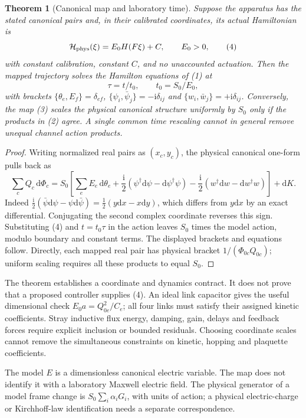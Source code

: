 \documentclass[10pt,a4paper]{article}
\newtheorem{theorem}{Theorem}
\newcommand{\dd}{\mathrm d}
\newcommand{\ii}{\mathrm i}
\begin{document}
\begin{theorem}[Canonical map and laboratory time]\label{th:map}
Suppose the apparatus has the stated canonical pairs and, in their calibrated coordinates, its actual Hamiltonian is
\[
\mathcal H_{\rm phys}(\xi)=E_0 H(F\xi)+C,\qquad E_0>0,
\tag{4}
\]
with constant calibration, constant $C$, and no unaccounted actuation. Then the mapped trajectory solves the Hamilton equations of (1) at
\[
\tau=t/t_0,\qquad t_0=S_0/E_0,
\tag{5}
\]
with brackets $\{\theta_e,E_f\}=\delta_{ef}$, $\{\psi_i,\bar\psi_j\}=-\ii\delta_{ij}$ and $\{w_i,\bar w_j\}=+\ii\delta_{ij}$. Conversely, the map (3) scales the physical canonical structure uniformly by $S_0$ only if the products in (2) agree. A single common time rescaling cannot in general remove unequal channel action products.
\end{theorem}
\begin{proof}
Writing normalized real pairs as $(x_c,y_c)$, the physical canonical one-form pulls back as
\[
\sum_c Q_c\,\dd\Phi_c
=S_0\left[\sum_e E_e\,\dd\theta_e+
\frac{\ii}{2}(\psi^\dagger\dd\psi-\dd\psi^\dagger\psi)
-\frac{\ii}{2}(w^\dagger\dd w-\dd w^\dagger w)\right]+\dd K.
\]
Indeed $\frac{\ii}{2}(\bar\psi\dd\psi-\psi\dd\bar\psi)=\frac12(y\dd x-x\dd y)$, which differs from $y\dd x$ by an exact differential. Conjugating the second complex coordinate reverses this sign. Substituting (4) and $t=t_0\tau$ in the action leaves $S_0$ times the model action, modulo boundary and constant terms. The displayed brackets and equations follow. Directly, each mapped real pair has physical bracket $1/(\Phi_{0c}Q_{0c})$; uniform scaling requires all these products to equal $S_0$.
\end{proof}
The theorem establishes a coordinate and dynamics contract. It does not prove that a proposed controller supplies (4). An ideal link capacitor gives the useful dimensional check $E_0 a=Q_{0e}^2/C_e$; all four links must satisfy their assigned kinetic coefficients. Stray inductive flux energy, damping, gain, delays and feedback forces require explicit inclusion or bounded residuals. Choosing coordinate scales cannot remove the simultaneous constraints on kinetic, hopping and plaquette coefficients.

The model $E$ is a dimensionless canonical electric variable. The map does not identify it with a laboratory Maxwell electric field. The physical generator of a model frame change is $S_0\sum_i\alpha_iG_i$, with units of action; a physical electric-charge or Kirchhoff-law identification needs a separate correspondence.
\end{document}
